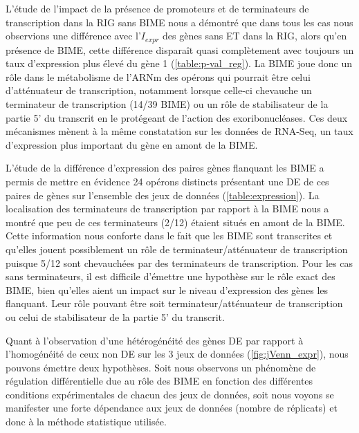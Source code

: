 \documentclass[12pt,a4paper]{report}
\begin{document}
\begin{onehalfspace}
L'étude de l'impact de la présence de promoteurs et de terminateurs de transcription dans la RIG sans BIME nous a démontré que dans tous les cas nous observions une différence avec l'$I_{expr}$ des gènes sans ET dans la RIG, alors qu'en présence de BIME, cette différence disparaît quasi complètement avec toujours un taux d'expression plus élevé du gène 1 (\autoref{table:p-val_reg}). La BIME joue donc un rôle dans le métabolisme de l'ARNm des opérons qui pourrait être celui d'atténuateur de transcription, notamment lorsque celle-ci chevauche un terminateur de transcription (14/39 BIME) ou un rôle de stabilisateur de la partie 5' du transcrit en le protégeant de l'action des exoribonucléases. Ces deux mécanismes mènent à la même constatation sur les données de RNA-Seq, un taux d'expression plus important du gène en amont de la BIME.

L'étude de la différence d'expression des paires gènes flanquant les BIME a permis de mettre en évidence 24 opérons distincts présentant une DE de ces paires de gènes sur l'ensemble des jeux de données (\autoref{table:expression}). La localisation des terminateurs de transcription par rapport à la BIME nous a montré que peu de ces terminateurs (2/12) étaient situés en amont de la BIME. Cette information nous conforte dans le fait que les BIME sont transcrites et qu'elles jouent possiblement un rôle de terminateur/atténuateur de transcription puisque 5/12 sont chevauchées par des terminateurs de transcription. Pour les cas sans terminateurs, il est difficile d'émettre une hypothèse sur le rôle exact des BIME, bien qu'elles aient un impact sur le niveau d'expression des gènes les flanquant. Leur rôle pouvant être soit terminateur/atténuateur de transcription ou celui de stabilisateur de la partie 5' du transcrit. 

Quant à l'observation d'une hétérogénéité des gènes DE par rapport à l'homogénéité de ceux non DE sur les 3 jeux de données (\autoref{fig:jVenn_expr}), nous pouvons émettre deux hypothèses. Soit nous observons un phénomène de régulation différentielle due au rôle des BIME en fonction des différentes conditions expérimentales de chacun des jeux de données, soit nous voyons se manifester une forte dépendance aux jeux de données (nombre de réplicats) et donc à la méthode statistique utilisée. 


\end{onehalfspace}
\end{document}
